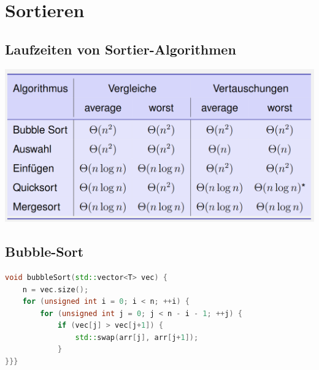 \section{Sortieren}

\begin{sectionbox}
\subsection{Laufzeiten von Sortier-Algorithmen}\smallskip
\begin{center}
    \includegraphics[width = \columnwidth]{../img/LaufzeitenSort.png}
\end{center}
\end{sectionbox}

\begin{sectionbox}
\subsection{Bubble-Sort}
\begin{lstlisting}[language=C++]
void bubbleSort(std::vector<T> vec) { 
    n = vec.size();
    for (unsigned int i = 0; i < n; ++i) {
        for (unsigned int j = 0; j < n - i - 1; ++j) {
            if (vec[j] > vec[j+1]) {
                std::swap(arr[j], arr[j+1]);
            }
}}}
\end{lstlisting}\vspace{-6px}
\end{sectionbox}

